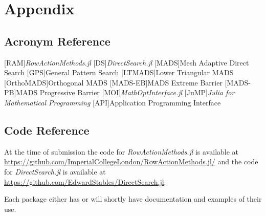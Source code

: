 \section{Appendix}
\subsection{Acronym Reference}
\begin{acronym}[OrthoMADS]\itemsep10pt
    [RAM]{\emph{RowActionMethods.jl}}
    [DS]{\emph{DirectSearch.jl}}
    [MADS]{Mesh Adaptive Direct Search}
    [GPS]{General Pattern Search}
    [LTMADS]{Lower Triangular MADS}
    [OrthoMADS]{Orthogonal MADS}
    [MADS-EB]{MADS Extreme Barrier}
    [MADS-PB]{MADS Progressive Barrier}
    [MOI]{\emph{MathOptInterface.jl}}
    [JuMP]{\emph{Julia for Mathematical Programming}}
    [API]{Application Programming Interface}
\end{acronym}

\subsection{Code Reference}
At the time of submission the code for \textit{RowActionMethods.jl} is available at \url{https://github.com/ImperialCollegeLondon/RowActionMethods.jl/} and the code for \textit{DirectSearch.jl} is available at \url{https://github.com/EdwardStables/DirectSearch.jl}. 

Each package either has or will shortly have documentation and examples of their use.
